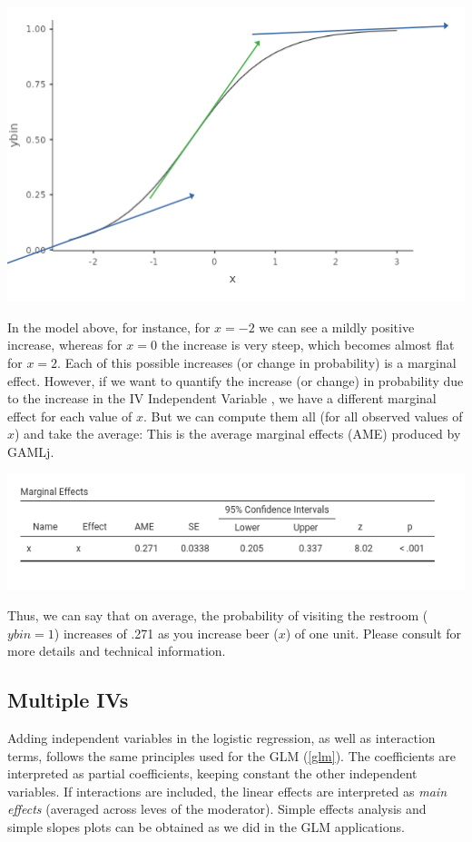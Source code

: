 \documentclass[
]{book}
\begin{document}
\includegraphics[width=6.97in]{bookletpics/3_logistic_plot3}

In the model above, for instance, for \(x=-2\) we can see a mildly positive increase, whereas for \(x=0\) the increase is very steep, which becomes almost flat for \(x=2\). Each of this possible increases (or change in probability) is a marginal effect. However, if we want to quantify the increase (or change) in probability due to the increase in the {IV {Independent Variable} }, we have a different marginal effect for each value of \(x\). But we can compute them all (for all observed values of \(x\)) and take the average: This is the average marginal effects (AME) produced by {GAMLj}.

\includegraphics[width=8.21in]{bookletpics/3_logistic_output5}

Thus, we can say that on average, the probability of visiting the restroom (\(ybin=1\)) increases of .271 as you increase beer (\(x\)) of one unit.
Please consult \citet{thomas} for more details and technical information.

\hypertarget{multiple-ivs}{%
\subsection{Multiple IVs}\label{multiple-ivs}}

Adding independent variables in the logistic regression, as well as interaction terms, follows the same principles used for the GLM (\ref{glm}). The coefficients are interpreted as partial coefficients, keeping constant the other independent variables. If interactions are included, the linear effects are interpreted as \emph{main effects} (averaged across leves of the moderator). Simple effects analysis and simple slopes plots can be obtained as we did in the GLM applications.
\end{document}
